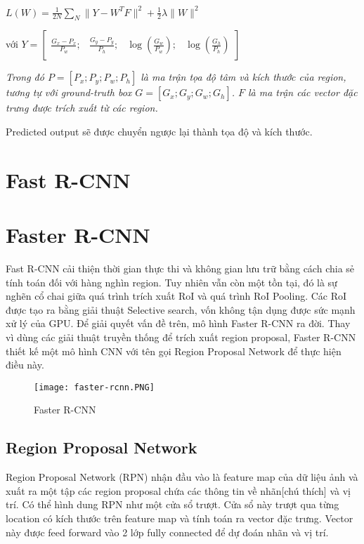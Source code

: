 \documentclass[../thesis.tex]{subfiles}
\begin{document}
$L(W) = \displaystyle\frac{1}{2N}\displaystyle\sum_{N}^{}\|Y - W^TF\|^2 + \frac{1}{2}\lambda\|W\|^2$

với $Y = 
\begin{bmatrix}
	\displaystyle\frac{G_x - P_x}{P_w}; & \displaystyle\frac{G_y - P_y}{P_h}; & \log\left(\displaystyle\frac{G_w}{P_w}\right); & \log\left(\displaystyle\frac{G_h}{P_h}\right)
\end{bmatrix}
$

\textit{Trong đó $P = \left[P_x; P_y; P_w; P_h\right]$ là ma trận tọa độ tâm và kích thước của region, tương tự với ground-truth box $G = \left[G_x; G_y; G_w; G_h\right]$. $F$ là ma trận các vector đặc trưng được trích xuất từ các region.}

Predicted output sẽ được chuyển ngược lại thành tọa độ và kích thước. 

\section{Fast R-CNN}


\section{Faster R-CNN}

Fast R-CNN cải thiện thời gian thực thi và không gian lưu trữ bằng cách chia sẻ tính toán đối với hàng nghìn region. Tuy nhiên vẫn còn một tồn tại, đó là sự nghẽn cổ chai giữa quá trình trích xuất RoI và quá trình RoI Pooling. Các RoI được tạo ra bằng giải thuật Selective search, vốn không tận dụng được sức mạnh xử lý của GPU. Để giải quyết vấn đề trên, mô hình Faster R-CNN ra đời. Thay vì dùng các giải thuật truyền thống để trích xuất region proposal, Faster R-CNN thiết kế một mô hình CNN với tên gọi Region Proposal Network để thực hiện điều này.

\begin{figure}[!htb]
	\centering
	\texttt{[image: faster-rcnn.PNG]}
	\caption{Faster R-CNN}\label{Fig:faster_rcnn}
\end{figure}

\subsection{Region Proposal Network}

Region Proposal Network (RPN) nhận đầu vào là feature map của dữ liệu ảnh và xuất ra một tập các region proposal chứa các thông tin về nhãn[chú thích] và vị trí. Có thể hình dung RPN như một cửa sổ trượt. Cửa sổ này trượt qua từng location có kích thước  trên feature map và tính toán ra vector đặc trưng. Vector này được feed forward vào 2 lớp fully connected để dự đoán nhãn và vị trí.
\end{document}
